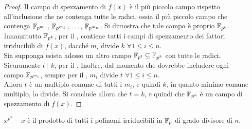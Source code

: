 \begin{proof}
    Il campo di spezzamento di $f(x)$ è il più piccolo campo rispetto all'inclusione
    che ne contenga tutte le radici, ossia il più piccolo campo che contenga
    $\mathbb{F}_{p^{m_1}}$, $\mathbb{F}_{p^{m_2}}$, $\ldots,\, \mathbb{F}_{p^{m_n}}$. Si dimostra che tale campo
    è proprio $\mathbb{F}_{p^{k}}$. \\
    
    Innanzitutto $\mathbb{F}_{p^{k}}$, per il , contiene tutti i campi di spezzamento dei fattori irriducibili di $f(x)$, dacché $m_i$ divide $k$ $\forall 1 \leq i \leq n$. \\
    
    Sia supponga esista adesso un altro campo $\mathbb{F}_{p^{t}} \subseteq \mathbb{F}_{p^{k}}$ con tutte le
    radici. Sicuramente $t \mid k$, per il . Inoltre, dal momento
    che dovrebbe includere ogni campo $\mathbb{F}_{p^{m_i}}$, sempre per il ,
    $m_i$ divide $t$ $\forall 1 \leq i \leq n$. \\
    
    Allora $t$ è un multiplo comune di tutti i $m_i$, e quindi $k$, in quanto minimo
    comune multiplo, lo divide. Si conclude allora che $t = k$, e quindi che
    $\mathbb{F}_{p^{k}}$ è un campo di spezzamento di $f(x)$.
\end{proof}

\begin{theorem}
    $x^{p^n}-x$ è il prodotto di tutti i polinomi irriducibili in $\mathbb{F}_p$
    di grado divisore di $n$.
\end{theorem}

